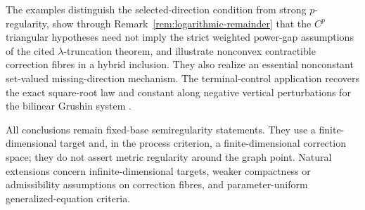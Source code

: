 \documentclass[11pt]{amsart}
\theoremstyle{definition}
\theoremstyle{remark}
\begin{document}
	The examples distinguish the selected-direction condition from strong
	$p$-regularity, show through Remark~\ref{rem:logarithmic-remainder} that the $C^p$
	triangular hypotheses need not imply the strict weighted power-gap
	assumptions of the cited $\lambda$-truncation theorem, and illustrate
	nonconvex contractible correction fibres in a hybrid inclusion. They also realize an
	essential nonconstant set-valued missing-direction mechanism. The
	terminal-control application recovers the exact square-root law and
	constant along negative vertical perturbations for the bilinear Grushin
	system \cite{AgrachevLeeGrushin}.
	
	All conclusions remain fixed-base semiregularity statements. They use a
	finite-dimensional target and, in the process criterion, a
	finite-dimensional correction space; they do not assert metric
	regularity around the graph point. Natural extensions concern
	infinite-dimensional targets, weaker compactness or admissibility
	assumptions on correction fibres, and parameter-uniform
	generalized-equation criteria.
	
\end{document}
